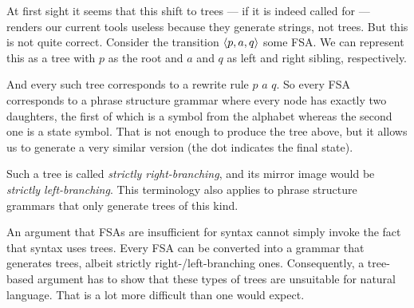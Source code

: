 At first sight it seems that this shift to trees --- if it is indeed called for --- renders our current tools useless because they generate strings, not trees.
But this is not quite correct.
Consider the transition $\left \langle p,a,q \right \rangle $ some FSA\@.
We can represent this as a tree with $p$ as the root and $a$ and $q$ as left and right sibling, respectively.
%
\begin{center}
    
\end{center}
%
And every such tree corresponds to a rewrite rule $p$ \rewrite $a$ $q$.
So every FSA corresponds to a phrase structure grammar where every node has exactly two daughters, the first of which is a symbol from the alphabet whereas the second one is a state symbol.
That is not enough to produce the tree above, but it allows us to generate a very similar version (the dot indicates the final state).
%
\begin{center}
    
\end{center}
%
Such a tree is called \emph{strictly right-branching}, and its mirror image would be \emph{strictly left-branching}.
This terminology also applies to phrase structure grammars that only generate trees of this kind.

An argument that FSAs are insufficient for syntax cannot simply invoke the fact that syntax uses trees.
Every FSA can be converted into a grammar that generates trees, albeit strictly right-\slash left-branching ones.
Consequently, a tree-based argument has to show that these types of trees are unsuitable for natural language.
That is a lot more difficult than one would expect.

